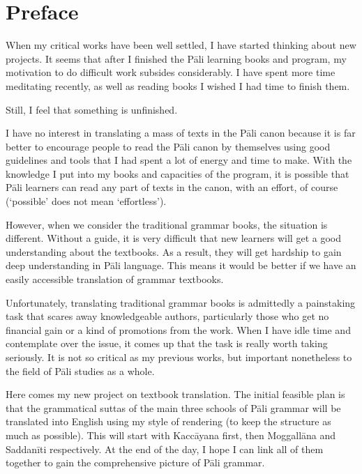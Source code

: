 \cleardoublepage
{}
{}
\chapter*{Preface}

When my critical works have been well settled, I have started thinking about new projects. It seems that after I finished the Pāli learning books and program, my motivation to do difficult work subsides considerably. I have spent more time meditating recently, as well as reading books I wished I had time to finish them.

Still, I feel that something is unfinished.

I have no interest in translating a mass of texts in the Pāli canon because it is far better to encourage people to read the Pāli canon by themselves using good guidelines and tools that I had spent a lot of energy and time to make. With the knowledge I put into my books and capacities of the program, it is possible that Pāli learners can read any part of texts in the canon, with an effort, of course (`possible' does not mean `effortless').

However, when we consider the traditional grammar books, the situation is different. Without a guide, it is very difficult that new learners will get a good understanding about the textbooks. As a result, they will get hardship to gain deep understanding in Pāli language. This means it would be better if we have an easily accessible translation of grammar textbooks.

Unfortunately, translating traditional grammar books is admittedly a painstaking task that scares away knowledgeable authors, particularly those who get no financial gain or a kind of promotions from the work. When I have idle time and contemplate over the issue, it comes up that the task is really worth taking seriously. It is not so critical as my previous works, but important nonetheless to the field of Pāli studies as a whole.

Here comes my new project on textbook translation. The initial feasible plan is that the grammatical suttas of the main three schools of Pāli grammar will be translated into English using my style of rendering (to keep the structure as much as possible). This will start with Kaccāyana first, then Moggallāna and Saddanīti respectively. At the end of the day, I hope I can link all of them together to gain the comprehensive picture of Pāli grammar.

